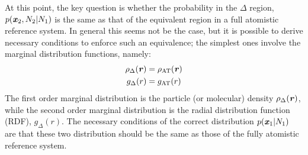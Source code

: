 \documentclass[aip,jcp,a4paper,reprint,onecolumn]{revtex4-1}
\newcommand{\vect}[1]{\textbf{\textit{#1}}}
\newcommand{\AT}{{\textrm{{AT}}}}
\newcommand{\HY}{{\Delta}}
\begin{document}
\noindent
At this point, the key question is whether the probability in the $\HY$ region, $p(\vect
x_2, N_2 | N_1)$ is the same as that of the equivalent region in a full atomistic reference
system. In general this seems not be the case, but it is possible to
derive necessary conditions to enforce such an equivalence; the simplest ones involve
the marginal distribution functions, namely:
\begin{align}
  \rho_{\HY}(\vect r) &= \rho_{\AT}(\vect r)\\
  g_{\HY}( r) &= g_{\AT}(r)
\end{align}
The first order marginal distribution is the particle (or molecular) density 
$\rho_{\HY}(\vect r)$, while the second order marginal distribution is
the radial distribution function (RDF), $g_{\HY}(r)$. The necessary
conditions of the correct distribution $p(\vect x_1|N_1)$
are that these two distribution should be the same as those of the fully atomistic reference system.
\end{document}
